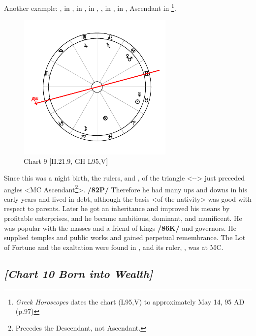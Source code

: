 Another example: \Sun, \Mercury\xspace in \Taurus, \Moon\xspace in \Aquarius, \Saturn\xspace in \Leo, \Mars, \Venus\xspace in \Cancer, \Jupiter\xspace in \Virgo, Ascendant in \Sagittarius
\footnote{\textit{Greek Horoscopes} dates the chart (L95,V) to approximately May 14, 95 AD (p.97)}.

\clearpage
\begin{figure}
\centering
\vspace{-20pt}
\includegraphics[width=0.68\textwidth]{charts/2_21_9}
\caption{Chart 9 [II.21.9, GH L95,V]}
\label{fig:chart09}
\end{figure}

Since this was a night birth, the rulers, \Saturn\xspace and \Mercury, of the triangle <\Gemini-\Libra-\Aquarius> just preceded angles <MC Ascendant\footnote{Precedes the Descendant, not Ascendant.}>. \textbf{/82P/} Therefore he had many ups and downs in his early years and lived in debt, although the basis <of the nativity> was good
with respect to parents. Later he got an inheritance and improved his means by profitable enterprises, and he became ambitious, dominant, and munificent. He was popular with the masses and a friend of kings \textbf{/86K/} and governors. He supplied temples and public works and gained perpetual remembrance. The Lot of Fortune and the exaltation were found in \Pisces, and its ruler, \Jupiter, was at MC.
\newpage
\subsection*{\textit{[Chart 10 Born into Wealth]}}

